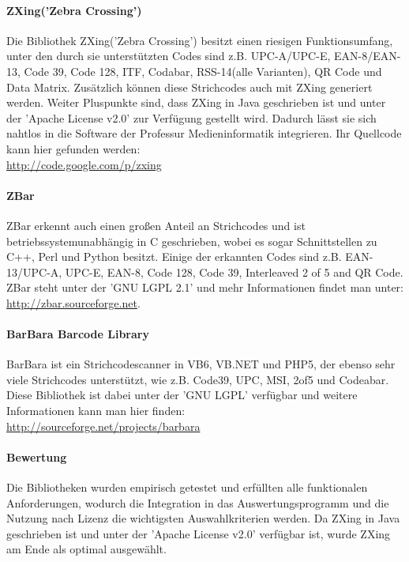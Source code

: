 \paragraph*{ZXing('Zebra Crossing')}
Die Bibliothek ZXing('Zebra Crossing') besitzt einen riesigen Funktionsumfang, unter den durch sie unterstützten Codes sind z.B. UPC-A/UPC-E, EAN-8/EAN-13, Code 39, Code 128, ITF, Codabar, RSS-14(alle Varianten), QR Code und Data Matrix. Zusätzlich können diese Strichcodes auch mit ZXing generiert werden. Weiter Pluspunkte sind, dass ZXing in Java geschrieben ist und unter der 'Apache License v2.0' zur Verfügung gestellt wird. Dadurch lässt sie sich nahtlos in die Software der Professur Medieninformatik integrieren. Ihr Quellcode kann hier gefunden werden:\\
\url{http://code.google.com/p/zxing}

\paragraph*{ZBar}
ZBar erkennt auch einen großen Anteil an Strichcodes und ist betriebssystemunabhängig in C geschrieben, wobei es sogar Schnittstellen zu C++, Perl und Python besitzt. Einige der erkannten Codes sind z.B. EAN-13/UPC-A, UPC-E, EAN-8, Code 128, Code 39, Interleaved 2 of 5 and QR Code. ZBar steht unter der 'GNU LGPL 2.1' und mehr Informationen findet man unter:\\
\url{http://zbar.sourceforge.net}.

\paragraph*{BarBara Barcode Library}
BarBara ist ein Strichcodescanner in VB6, VB.NET und PHP5, der ebenso sehr viele Strichcodes unterstützt, wie z.B. Code39, UPC, MSI, 2of5 und Codeabar. Diese Bibliothek ist dabei unter der 'GNU LGPL' verfügbar und weitere Informationen kann man hier finden:\\
\url{http://sourceforge.net/projects/barbara}

\paragraph*{Bewertung}
Die Bibliotheken wurden empirisch getestet und erfüllten alle funktionalen Anforderungen, wodurch die Integration in das Auswertungsprogramm und die Nutzung nach Lizenz die wichtigsten Auswahlkriterien werden. Da ZXing in Java geschrieben ist und unter der 'Apache License v2.0' verfügbar ist, wurde ZXing am Ende als optimal ausgewählt.